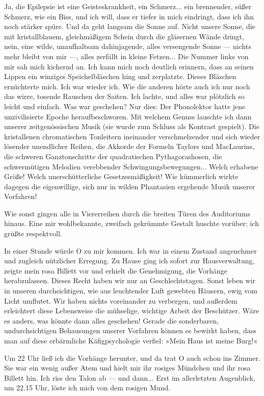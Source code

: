 Ja, die Epilepsie ist eine Geisteskrankheit, ein Schmerz... ein
brennender, süßer Schmerz, wie ein Biss, und ich will, dass er
tiefer in mich eindringt, dass ich ihn noch stärker spüre. Und da
geht langsam die Sonne auf. Nicht unsere Sonne, die mit
kristallblauem, gleichmäßigem Schein durch die gläsernen Wände
dringt, nein, eine wilde, unaufhaltsam dahinjagende, alles
versengende Sonne — nichts mehr bleibt von mir —, alles zerfällt in
kleine Fetzen... Die Nummer links von mir sah mich kichernd an. Ich
kann mich noch deutlich erinnern, dass an seinen Lippen ein
winziges Speichelbläschen hing und zerplatzte. Dieses Bläschen
ernüchterte mich. Ich war wieder ich. Wie die anderen hörte auch
ich nur noch das wirre, tosende Rauschen der Saiten. Ich lachte,
und alles war plötzlich so leicht und einfach. Was war geschehen?
Nur dies: Der Phonolektor hatte jene unzivilisierte Epoche
heraufbeschworen. Mit welchem Genuss lauschte ich dann unserer
zeitgenössischen Musik (sie wurde zum Schluss als Kontrast
gespielt). Die kristallenen chromatischen Tonleitern ineinander
verschmelzender und sich wieder lösender unendlicher Reihen, die
Akkorde der Formeln Taylors und MacLaurins, die schweren
Ganztonschritte der quadratischen Pythagorashosen, die
schwermütigen Melodien verebbender Schwingungsbewegungen... Welch
erhabene Größe! Welch unerschütterliche Gesetzesmäßigkeit! Wie
kümmerlich wirkte dagegen die eigenwillige, sich nur in wilden
Phantasien ergehende Musik unserer Vorfahren!

Wie sonst gingen alle in Viererreihen durch die breiten Türen des
Auditoriums hinaus. Eine mir wohlbekannte, zweifach gekrümmte
Gestalt huschte vorüber; ich grüßte respektvoll.

In einer Stunde würde O zu mir kommen. Ich war in einem Zustand
angenehmer und zugleich nützlicher Erregung. Zu Hause ging ich
sofort zur Hausverwaltung, zeigte mein rosa Billett vor und erhielt
die Genehmigung, die Vorhänge herabzulassen. Dieses Recht haben wir
nur an Geschlechtstagen. Sonst leben wir in unseren durchsichtigen,
wie aus leuchtender Luft gewebten Häusern, ewig vom Licht umflutet.
Wir haben nichts voreinander zu verbergen, und außerdem erleichtert
diese Lebensweise die mühselige, wichtige Arbeit der Beschützer.
Wäre es anders, was könnte dann alles geschehen! Gerade die
sonderbaren, undurchsichtigen Behausungen unserer Vorfahren können
es bewirkt haben, dass man auf diese erbärmliche Käfigpsychologie
verfiel: »Mein Haus ist meine Burg!«

Um 22 Uhr ließ ich die Vorhänge herunter, und da trat O auch schon
ins Zimmer. Sie war ein wenig außer Atem und hielt mir ihr rosiges
Mündchen und ihr rosa Billett hin. Ich riss den Talon ab — und
dann... Erst im allerletzten Augenblick, um 22.15 Uhr, löste ich
mich von dem rosigen Mund.

